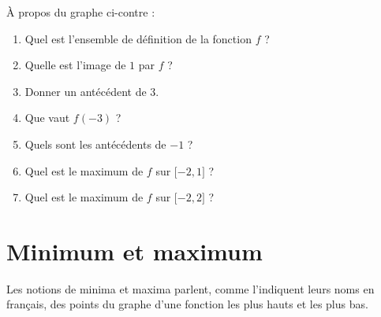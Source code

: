 \begin{multicols}{2}

À propos du graphe ci-contre :
\begin{enumerate}
    \item
        Quel est l'ensemble de définition de la fonction \( f\) ?
    \item
        Quelle est l'image de \( 1\) par \( f\) ?
    \item
        Donner un antécédent de \( 3\).
    \item
        Que vaut \( f(-3)\) ?
    \item
        Quels sont les antécédents de \( -1\) ?
    \item 
        Quel est le maximum de \( f\) sur \( \mathopen[ -2 , 1 \mathclose]\) ?
    \item
        Quel est le maximum de \( f\) sur \( \mathopen[ -2 , 2 \mathclose]\) ?
\end{enumerate}
    
    \columnbreak

\begin{center}
   
\end{center}

\end{multicols}


    \section{Minimum et maximum}


Les notions de minima et maxima parlent, comme l'indiquent leurs noms en français, des points du graphe d'une fonction les plus hauts et les plus bas.

